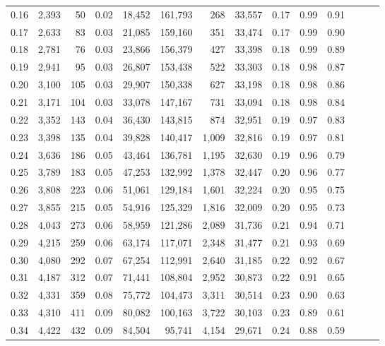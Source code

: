 \begin{tabular}{rrrrrrrrrrrrrr}
0.16 &  2,393 &   50 &  0.02 &   18,452 &  161,793 &     268 &  33,557 &  0.17 &  0.99 &      0.91 \\
0.17 &  2,633 &   83 &  0.03 &   21,085 &  159,160 &     351 &  33,474 &  0.17 &  0.99 &      0.90 \\
0.18 &  2,781 &   76 &  0.03 &   23,866 &  156,379 &     427 &  33,398 &  0.18 &  0.99 &      0.89 \\
0.19 &  2,941 &   95 &  0.03 &   26,807 &  153,438 &     522 &  33,303 &  0.18 &  0.98 &      0.87 \\
0.20 &  3,100 &  105 &  0.03 &   29,907 &  150,338 &     627 &  33,198 &  0.18 &  0.98 &      0.86 \\
0.21 &  3,171 &  104 &  0.03 &   33,078 &  147,167 &     731 &  33,094 &  0.18 &  0.98 &      0.84 \\
0.22 &  3,352 &  143 &  0.04 &   36,430 &  143,815 &     874 &  32,951 &  0.19 &  0.97 &      0.83 \\
0.23 &  3,398 &  135 &  0.04 &   39,828 &  140,417 &   1,009 &  32,816 &  0.19 &  0.97 &      0.81 \\
0.24 &  3,636 &  186 &  0.05 &   43,464 &  136,781 &   1,195 &  32,630 &  0.19 &  0.96 &      0.79 \\
0.25 &  3,789 &  183 &  0.05 &   47,253 &  132,992 &   1,378 &  32,447 &  0.20 &  0.96 &      0.77 \\
0.26 &  3,808 &  223 &  0.06 &   51,061 &  129,184 &   1,601 &  32,224 &  0.20 &  0.95 &      0.75 \\
0.27 &  3,855 &  215 &  0.05 &   54,916 &  125,329 &   1,816 &  32,009 &  0.20 &  0.95 &      0.73 \\
0.28 &  4,043 &  273 &  0.06 &   58,959 &  121,286 &   2,089 &  31,736 &  0.21 &  0.94 &      0.71 \\
0.29 &  4,215 &  259 &  0.06 &   63,174 &  117,071 &   2,348 &  31,477 &  0.21 &  0.93 &      0.69 \\
0.30 &  4,080 &  292 &  0.07 &   67,254 &  112,991 &   2,640 &  31,185 &  0.22 &  0.92 &      0.67 \\
0.31 &  4,187 &  312 &  0.07 &   71,441 &  108,804 &   2,952 &  30,873 &  0.22 &  0.91 &      0.65 \\
0.32 &  4,331 &  359 &  0.08 &   75,772 &  104,473 &   3,311 &  30,514 &  0.23 &  0.90 &      0.63 \\
0.33 &  4,310 &  411 &  0.09 &   80,082 &  100,163 &   3,722 &  30,103 &  0.23 &  0.89 &      0.61 \\
0.34 &  4,422 &  432 &  0.09 &   84,504 &   95,741 &   4,154 &  29,671 &  0.24 &  0.88 &      0.59 \\

\end{tabular}
